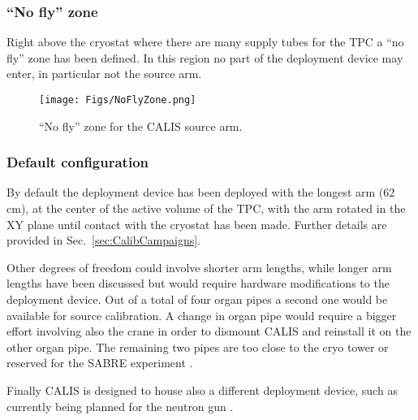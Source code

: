\subsubsection{``No fly'' zone}
Right above the cryostat where there are many supply tubes for the TPC a ``no fly'' zone has been defined. In this region no part of the deployment device may enter, in particular not the source arm.

\begin{figure}[htbp]
 \centering
  \texttt{[image: Figs/NoFlyZone.png]}
  \caption{``No fly'' zone for the CALIS source arm.}
  \label{fig:NoFlyZone}
\end{figure} 

\subsubsection{Default configuration}
By default the deployment device has been deployed with the longest arm (62 cm), at the center of the active volume of the TPC, with the arm rotated in the XY plane until contact with the cryostat has been made. Further details are provided in Sec.~\ref{sec:CalibCampaigns}.

Other degrees of freedom could involve shorter arm lengths, while longer arm lengths have been discussed but would require hardware modifications to the deployment device. Out of a total of four organ pipes a second one would be available for source calibration. A change in organ pipe would require a bigger effort involving also the crane in order to dismount CALIS and reinstall it on the other organ pipe. The remaining two pipes are too close to the cryo tower or reserved for the SABRE experiment \cite{SABRE}.

Finally CALIS is designed to house also a different deployment device, such as currently being planned for the neutron gun \cite{???}.